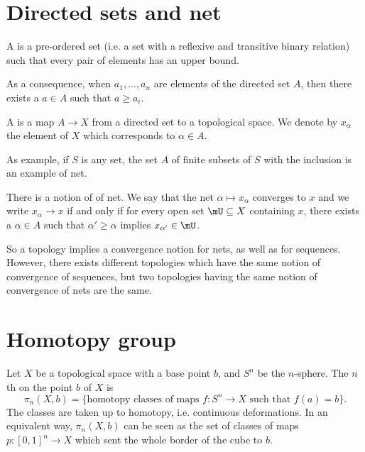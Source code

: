 
\section{Directed sets and net}

\begin{definition}
	A  is a pre-ordered set (i.e. a set with a reflexive and transitive binary relation) such that every pair of elements has an upper bound.
\end{definition}
As a consequence, when \( a_1,\ldots, a_n\) are elements of the directed set \( A\), then there exists a \( a\in A\) such that \( a\geq a_i\).

\begin{definition}
	A  is a map \( A\to X\) from a directed set to a topological space. We denote by \( x_{\alpha}\) the element of \( X\) which corresponds to \( \alpha\in A\).
\end{definition}

As example, if \( S\) is any set, the set \( A\) of finite subsets of \( S\) with the inclusion is an example of net.

There is a notion of  of net. We say that the net \( \alpha\mapsto x_\alpha\) converges to \( x\) and we write \( x_{\alpha}\to x\) if and only if for every open set \( \mU\subseteq X\) containing \( x\), there exists a \( \alpha\in A\) such that \( \alpha'\geq \alpha\) implies \( x_{\alpha'}\in\mU\).

So a topology implies a convergence notion for nets, as well as for sequences. However, there exists different topologies which have the same notion of convergence of sequences, but two topologies having the same notion of convergence of nets are the same.


\section{Homotopy group}

Let \( X\) be a topological space with a base point \( b\), and \( S^n\) be the \( n\)-sphere. The \( n\)th  on the point \( b\) of \( X\) is
\begin{equation}
	\pi_n(X,b)=\{ \text{homotopy classes of maps }f\colon S^n\to X \text{ such that } f(a)=b \}.
\end{equation}
The classes are taken up to homotopy, i.e. continuous deformations. In an equivalent way, \( \pi_n(X,b)\) can be seen as the set of classes of maps \( p\colon [0,1]^n\to X\) which sent the whole border of the cube to \( b\).

